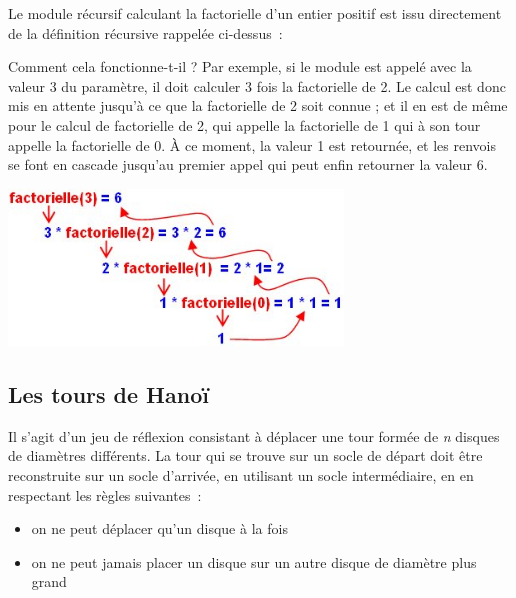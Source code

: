 		Le module récursif calculant la factorielle d'un entier positif 
		est issu directement de la définition récursive rappelée
		ci-dessus~:


		Comment cela fonctionne-t-il ? Par exemple, si le module est 
		appelé avec la valeur 3 du paramètre, il doit calculer 3 fois la 
		factorielle de 2. Le calcul est donc mis en attente jusqu'à ce 
		que la factorielle de 2 soit connue ; et il en est de même pour 
		le calcul de factorielle de 2, qui appelle la factorielle de 1 
		qui à son tour appelle la factorielle de 0. À ce moment, la 
		valeur 1 est retournée, et les renvois se font en cascade 
		jusqu'au premier appel qui peut enfin retourner la valeur 6.

		\begin{center}
		\includegraphics[width=8.902cm,height=4.159cm]{image/a2012Logique2eme-img021.jpg}
		\end{center}

	\subsection{Les tours de Hanoï}

		Il s'agit d'un jeu de réflexion consistant à déplacer une tour formée 
		de \textit{n} disques de diamètres différents. La tour qui se trouve 
		sur un socle de départ doit être reconstruite sur un socle d'arrivée, 
		en utilisant un socle intermédiaire, en en respectant les règles suivantes~:

		\begin{itemize}
			\item {
				on ne peut déplacer qu'un disque à la fois}
			\item {
				on ne peut jamais placer un disque sur un autre disque de diamètre plus grand}
		\end{itemize}

